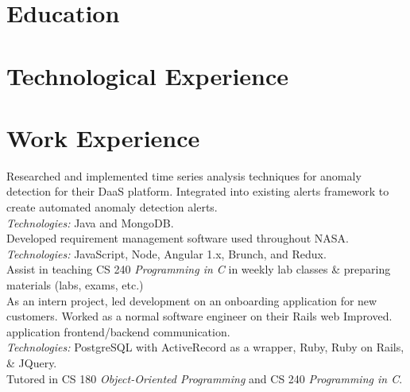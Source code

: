 \documentclass[11pt,letter,sans]{moderncv}
\begin{document}
\makecvtitle
\vspace{-40pt}
\section{Education}

\section{Technological Experience}

\section{Work Experience}

Researched and implemented time series analysis techniques for anomaly detection for their DaaS platform. Integrated into existing alerts framework to create automated anomaly detection alerts.
\\
\textit{Technologies:} Java and MongoDB.
\\
Developed requirement management software used throughout NASA.
\\
\textit{Technologies:} JavaScript, Node, Angular 1.x, Brunch, and Redux.
\\
Assist in teaching CS 240 \textit{Programming in C} in weekly lab classes \& preparing materials (labs, exams, etc.)
\\
As an intern project, led development on an onboarding application for new customers.
Worked as a normal software engineer on their Rails web Improved.
application frontend/backend communication.
\\
\textit{Technologies:} PostgreSQL with ActiveRecord as a wrapper, Ruby, Ruby on Rails, \& JQuery.
\\
Tutored in CS 180 \textit{Object-Oriented Programming} and CS 240 \textit{Programming in C}.
\end{document}
